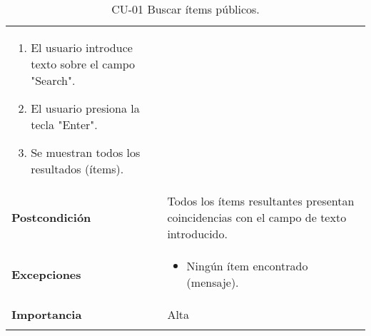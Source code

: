 \begin{longtable}[]{@{}ll@{}}
\begin{minipage}[t]{0.73\columnwidth}
\begin{enumerate}
\def\labelenumi{\arabic{enumi}.}
\tightlist
\item
  El usuario introduce texto sobre el campo "Search".
\item
  El usuario presiona la tecla "Enter".
\item
  Se muestran todos los resultados (ítems).
\end{enumerate}\strut
\end{minipage}\tabularnewline
\begin{minipage}[t]{0.21\columnwidth}\raggedright
\textbf{Postcondición}\strut
\end{minipage} & \begin{minipage}[t]{0.73\columnwidth}\raggedright
Todos los ítems resultantes presentan coincidencias con el campo de
texto introducido.\strut
\end{minipage}\tabularnewline
\begin{minipage}[t]{0.21\columnwidth}\raggedright
\textbf{Excepciones}\strut
\end{minipage} & \begin{minipage}[t]{0.73\columnwidth}\raggedright
\begin{itemize}
\tightlist
\item
  Ningún ítem encontrado (mensaje).
\end{itemize}\strut
\end{minipage}\tabularnewline
\begin{minipage}[t]{0.21\columnwidth}\raggedright
\textbf{Importancia}\strut
\end{minipage} & \begin{minipage}[t]{0.73\columnwidth}\raggedright
Alta\strut
\end{minipage}\tabularnewline
\bottomrule
\caption{CU-01 Buscar ítems públicos.}
\end{longtable}

